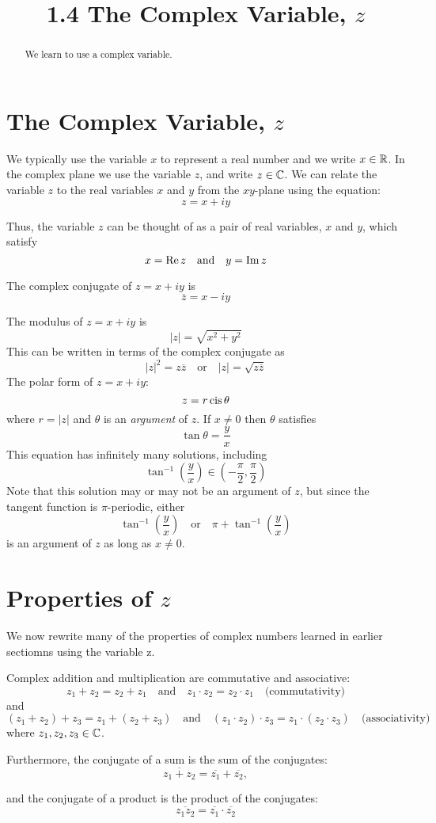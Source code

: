 \documentclass[handout]{ximera}
\title{1.4 The Complex Variable, $z$}
\begin{document}
\begin{abstract}
We learn to use a complex variable.
\end{abstract}

\maketitle

\section{The Complex Variable, $z$}

We typically use the variable $x$ to represent a real number and we write $x \in \mathbb R$.
In the complex plane we use the variable $z$, and write $z \in \mathbb C$. We can relate the variable $z$ to the real variables $x$ and $y$
from the $xy$-plane using the equation:
\[
z = x+iy
\]

Thus, the variable $z$ can be thought of as a pair of real variables, $x$ and $y$, 
which satisfy
\[
x = \operatorname{Re}{z} \quad \mbox{and} \quad y = \operatorname{Im}{z}
\]

The complex conjugate of $z = x+iy$ is
\[
\overline{z} = x-iy
\]

The modulus of $z = x+iy$ is
\[
|z| = \sqrt{x^2 + y^2}
\]
This can be written in terms of the complex conjugate as
\[
|z|^2 = z\overline{z} \quad \mbox{or} \quad |z| = \sqrt{z\overline{z}}
\]
The polar form of $z = x+iy$:
\[
z = r \operatorname{cis} \theta
\]
where $r = |z|$ and $\theta$ is an {\it argument} of $z$. If $x \neq 0$ then $\theta$ satisfies
\[
\tan \theta = \frac{y}{x}
\]
This equation has infinitely many solutions, including
\[ 
\tan^{-1} \left(\frac{y}{x}\right) \in \left(-\frac{\pi}{2}, \frac{\pi}{2}\right)
\]
Note that this solution may or may not be an argument of $z$, but since the tangent function is $\pi$-periodic,
either
\[
\tan^{-1} \left(\frac{y}{x}\right) \quad \mbox{or} \quad \pi + \tan^{-1} \left(\frac{y}{x}\right)
\]
is an argument of $z$ as long as $x \neq 0$.


\section{Properties of $z$}


We now rewrite many of the properties of complex numbers learned in earlier sectiomns using the variable z.


Complex addition and multiplication are commutative and associative: 
\[
z_1 + z_2 = z_2 + z_1 \quad \mbox{and} \quad z_1 \cdot z_2 = z_2 \cdot z_1 \quad \mbox{(commutativity)}
\]
and
\[
(z_1 + z_2) + z_3  = z_1 + (z_2 + z_3) \quad \mbox{and} \quad (z_1 \cdot z_2) \cdot z_3  = z_1 \cdot (z_2 \cdot z_3) \quad \mbox{(associativity)}
\]
where $z_1, z_2, z_3 \in \mathbb C$.

Furthermore, the conjugate of a sum is the sum of the conjugates:
\[
\overline{z_1 + z_2} = \overline{z_1} + \overline{z_2},
\]

and the conjugate of a product is the product of the conjugates:
\[
\overline{z_1 z_2} = \overline{z_1} \cdot \overline{z_2}
\]
\end{document}
